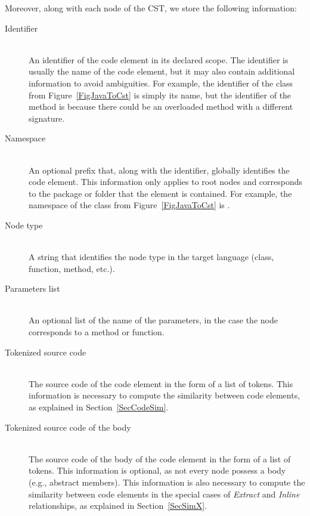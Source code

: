 Moreover, along with each node of the CST, we store the following information:
\begin{description}
    \item[Identifier] \hfill \\
    An identifier of the code element in its declared scope. 
    The identifier is usually the name of the code element, but it may also contain additional information to avoid ambiguities.
    For example, the identifier of the class  from Figure~\ref{FigJavaToCst} is simply its name, but the identifier of the method  is  because there could be an overloaded method with a different signature.
    
    \item[Namespace] \hfill \\
    An optional prefix that, along with the identifier, globally identifies the code element. 
    This information only applies to root nodes and corresponds to the package or folder that the element is contained. For example, the namespace of the class  from Figure~\ref{FigJavaToCst} is .
    
    \item[Node type] \hfill \\
    A string that identifies the node type in the target language (class, function, method, etc.).
    
    \item[Parameters list]  \hfill \\
    An optional list of the name of the parameters, in the case the node corresponds to a method or function.
    
    \item[Tokenized source code]  \hfill \\
    The source code of the code element in the form of a list of tokens. 
    This information is necessary to compute the similarity between code elements, as explained in Section~\ref{SecCodeSim}.
    
    \item[Tokenized source code of the body]  \hfill \\
    The source code of the body of the code element in the form of a list of tokens. 
    This information is optional, as not every node possess a body (e.g., abstract members).
    This information is also necessary to compute the similarity between code elements in the special cases of \textit{Extract} and \textit{Inline} relationships, as explained in Section~\ref{SecSimX}.
    
\end{description}


